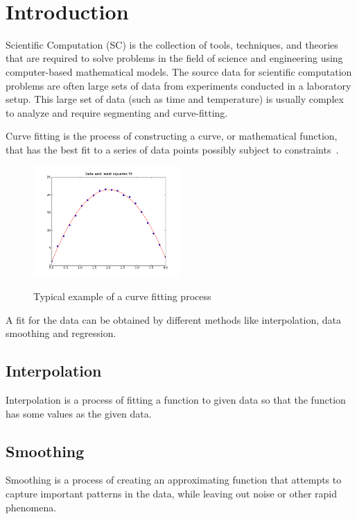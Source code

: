 \documentclass[12pt]{article}
\begin{document}
\newpage

\tableofcontents

~\newpage


\section{Introduction}

Scientific Computation (SC) is the collection of tools, techniques, and theories that are required to solve problems in the field of science and engineering using computer-based mathematical models. The source data for scientific computation problems are often large sets of data from experiments conducted in a laboratory setup. This large set of data (such as time and temperature) is usually complex to analyze and require segmenting and curve-fitting.

Curve fitting is the process of constructing a curve, or mathematical function, that has the best fit to a series of data points possibly subject to constraints~\cite{CurvefitWiki}.
\begin{figure}[h!]
	\begin{center}
		{
			\includegraphics[width=0.5\textwidth]{lstsq11.png}
		}
		\caption{\label{Fig_CurveFitEg} Typical example of a curve fitting process}
	\end{center}
\end{figure}

A fit for the data can be obtained by different methods like interpolation, data smoothing and regression.

\subsection{Interpolation}
Interpolation is a process of fitting a function to given data so that the function has some values as the given data.

\subsection{Smoothing}
Smoothing is a process of creating an approximating function that attempts to capture important patterns in the data, while leaving out noise or other rapid phenomena.
\end{document}
